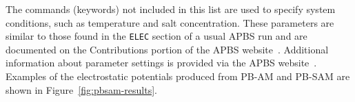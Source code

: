 \documentclass[12pt,titlepage]{article}
\newcommand{\keyword}[1]{\texttt{#1}}
\newcommand{\revision}[1]{#1}
\begin{document}
The commands (keywords) not included in this list are used to specify system conditions, such as temperature and salt concentration. These parameters are similar to those found in the \keyword{ELEC} section of a usual APBS run and are documented on the Contributions portion of the APBS website~\cite{APBSweb}. 
Additional information about parameter settings is provided via the APBS website~\cite{APBSweb}.
\revision{Examples of the electrostatic potentials produced from PB-AM and PB-SAM are shown in Figure~\ref{fig:pbsam-results}.}

\printbibliography
\end{document}
